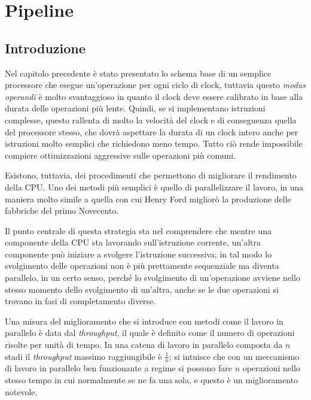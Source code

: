 



\chapter{Pipeline}

\section{Introduzione}
Nel capitolo precedente è stato presentato lo schema base di un semplice processore che esegue un'operazione per ogni ciclo di clock, tuttavia questo \emph{modus operandi} è molto svantaggioso in quanto il clock deve essere calibrato in base alla durata delle operazioni più lente. Quindi, se si implementano istruzioni complesse, questo rallenta di molto la velocità del clock e di conseguenza quella del processore stesso, che dovrà aspettare la durata di un clock intero anche per istruzioni molto semplici che richiedono meno tempo. Tutto ciò rende impossibile compiere ottimizzazioni aggressive sulle operazioni più comuni.

Esistono, tuttavia, dei procedimenti che permettono di migliorare il rendimento della CPU.
Uno dei metodi più semplici è quello di parallelizzare il lavoro, in una maniera molto simile a quella con cui Henry Ford migliorò la produzione delle fabbriche del primo Novecento.

Il punto centrale di questa strategia sta nel comprendere che mentre una componente della CPU sta lavorando sull'istruzione corrente, un'altra componente può iniziare a svolgere l'istruzione successiva; in tal modo lo svolgimento delle operazioni non è più prettamente sequenziale ma diventa parallelo, in un certo senso, perché lo svolgimento di un'operazione avviene nello stesso momento dello svolgimento di un'altra, anche se le due operazioni si trovano in fasi di completamento diverse.

Una misura del miglioramento che si introduce con metodi come il lavoro in parallelo è data dal \emph{throughput}, il quale è definito come il numero di operazioni risolte per unità di tempo. In una catena di lavoro in parallelo composta da \(n\) stadi il \emph{throughput} massimo raggiungibile è \(\frac{1}{n}\); si intuisce che con un meccanismo di lavoro in parallelo ben funzionante a regime si possono fare \(n\) operazioni nello stesso tempo in cui normalmente se ne fa una sola, e questo è un miglioramento notevole.

